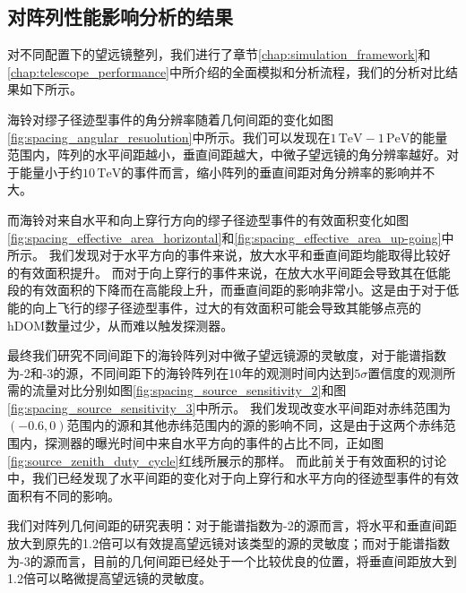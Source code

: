 \subsection{对阵列性能影响分析的结果}

对不同配置下的望远镜整列，我们进行了章节\ref{chap:simulation_framework}和\ref{chap:telescope_performance}中所介绍的全面模拟和分析流程，我们的分析对比结果如下所示。


海铃对缪子径迹型事件的角分辨率随着几何间距的变化如图\ref{fig:spacing_angular_resuolution}中所示。我们可以发现在$1\,\mathrm{TeV} - 1\,\mathrm{PeV}$的能量范围内，阵列的水平间距越小，垂直间距越大，中微子望远镜的角分辨率越好。对于能量小于约$10\,\mathrm{TeV}$的事件而言，缩小阵列的垂直间距对角分辨率的影响并不大。

而海铃对来自水平和向上穿行方向的缪子径迹型事件的有效面积变化如图\ref{fig:spacing_effective_area_horizontal}和\ref{fig:spacing_effective_area_up-going}中所示。
我们发现对于水平方向的事件来说，放大水平和垂直间距均能取得比较好的有效面积提升。
而对于向上穿行的事件来说，在放大水平间距会导致其在低能段的有效面积的下降而在高能段上升，而垂直间距的影响非常小。这是由于对于低能的向上飞行的缪子径迹型事件，过大的有效面积可能会导致其能够点亮的hDOM数量过少，从而难以触发探测器。

最终我们研究不同间距下的海铃阵列对中微子望远镜源的灵敏度，对于能谱指数为-2和-3的源，不同间距下的海铃阵列在10年的观测时间内达到$5\sigma$置信度的观测所需的流量对比分别如图\ref{fig:spacing_source_sensitivity_2}和图\ref{fig:spacing_source_sensitivity_3}中所示。
我们发现改变水平间距对赤纬范围为$(-0.6, 0)$范围内的源和其他赤纬范围内的源的影响不同，这是由于这两个赤纬范围内，探测器的曝光时间中来自水平方向的事件的占比不同，正如图\ref{fig:source_zenith_duty_cycle}红线所展示的那样。
而此前关于有效面积的讨论中，我们已经发现了水平间距的变化对于向上穿行和水平方向的径迹型事件的有效面积有不同的影响。

我们对阵列几何间距的研究表明：对于能谱指数为-2的源而言，将水平和垂直间距放大到原先的1.2倍可以有效提高望远镜对该类型的源的灵敏度；而对于能谱指数为-3的源而言，目前的几何间距已经处于一个比较优良的位置，将垂直间距放大到1.2倍可以略微提高望远镜的灵敏度。

